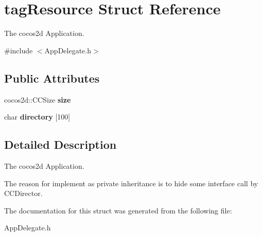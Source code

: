 \hypertarget{structtag_resource}{\section{tag\-Resource Struct Reference}
\label{structtag_resource}
}


The cocos2d Application.  




{\ttfamily \#include $<$App\-Delegate.\-h$>$}

\subsection*{Public Attributes}
\begin{DoxyCompactItemize}
\item 
\hypertarget{structtag_resource_a8640b003a8c5eef990ac1d0bd092c1c9}{cocos2d\-::\-C\-C\-Size {\bfseries size}}\label{structtag_resource_a8640b003a8c5eef990ac1d0bd092c1c9}

\item 
\hypertarget{structtag_resource_a347655ec02bf050e771cb4e6cb595537}{char {\bfseries directory} \mbox{[}100\mbox{]}}\label{structtag_resource_a347655ec02bf050e771cb4e6cb595537}

\end{DoxyCompactItemize}


\subsection{Detailed Description}
The cocos2d Application. 

The reason for implement as private inheritance is to hide some interface call by C\-C\-Director. 

The documentation for this struct was generated from the following file\-:\begin{DoxyCompactItemize}
\item 
App\-Delegate.\-h\end{DoxyCompactItemize}
